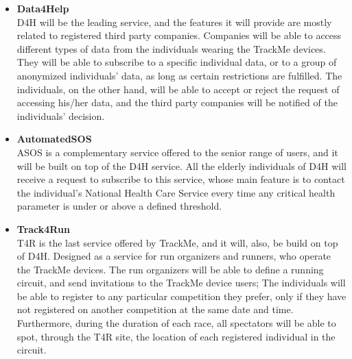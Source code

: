 \documentclass[hidelinks, 12pt]{report}
\begin{document}
\begin{itemize}
\item{\textbf{Data4Help}}
\\D4H will be the leading service, and the features it will provide are mostly related to registered third party companies. Companies will be able to access different types of data from the individuals wearing the TrackMe devices. They will be able to subscribe to a specific individual data, or to a group of anonymized individuals' data, as long as certain restrictions are fulfilled. The individuals, on the other hand, will be able to accept or reject the request of accessing his/her data, and the third party companies will be notified of the individuals' decision.

\item{\textbf{AutomatedSOS}}
\\ ASOS is a complementary service offered to the senior range of users, and it will be built on top of the D4H service. All the elderly individuals of D4H will receive a request to subscribe to this service, whose main feature is to contact the individual's National Health Care Service every time any critical health parameter is under or above a defined threshold.

\item{\textbf{Track4Run}}
\\T4R is the last service offered by TrackMe, and it will, also, be build on top of D4H. Designed as a service for run organizers and runners, who operate the TrackMe devices. The run organizers will be able to define a running circuit, and send invitations to the TrackMe device users; The individuals will be able to register to any particular competition they prefer, only if they have not registered on another competition at the same date and time. Furthermore, during the duration of each race, all spectators will be able to spot, through the T4R site, the location of each registered individual in the circuit.
\end{itemize}
\end{document}
